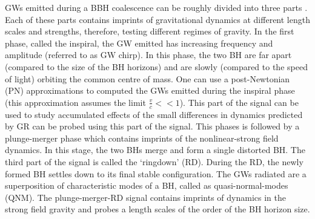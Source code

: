 GWs emitted during a BBH coalescence can be roughly divided into three parts \cite{JCreightonBook}. Each of these parts contains imprints of gravitational dynamics at different length scales and strengths, therefore, testing different regimes of gravity.  In the first phase, called the inspiral, the GW emitted has increasing frequency and amplitude (referred to as GW chirp). In this phase, the two BH are far apart (compared to the size of the BH horizons) and are slowly (compared to the speed of light)  orbiting the common centre of mass. One can use a post-Newtonian (PN) approximations to computed the GWs emitted during the inspiral phase (this approximation assumes the limit $\frac{v}{c} << 1$). This part of the signal can be used to  study accumulated effects of the small differences in dynamics predicted by GR can be probed using this part of the signal. This phases is followed by a plunge-merger phase which contains imprints of the nonlinear-strong field dynamics. In this stage, the two BHs merge and form a single distorted BH. The third part of the signal is called the `ringdown' (RD).  During the RD, the newly formed BH settles down to its final stable configuration. The GWs radiated are a superposition of characteristic modes of a BH, called as quasi-normal-modes (QNM). The plunge-merger-RD signal contains imprints of dynamics in the strong field gravity and probes a length scales of the order of the BH horizon size.  





